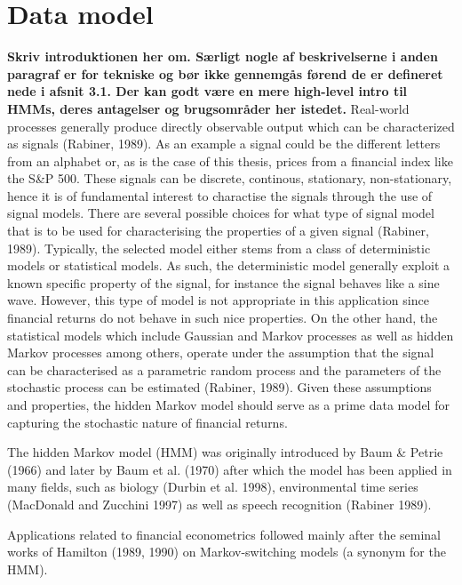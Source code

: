 \newpage
 \section{Data model}
 
 \textbf{Skriv introduktionen her om. Særligt nogle af beskrivelserne i anden paragraf er for tekniske og bør ikke gennemgås førend de er defineret nede i afsnit 3.1. Der kan godt være en mere high-level intro til HMMs, deres antagelser og brugsområder her istedet.}
Real-world processes generally produce directly observable output which can be characterized as signals (Rabiner, 1989). As an example a signal could be the different letters from an alphabet or, as is the case of this thesis, prices from a financial index like the S\&P 500. These signals can be discrete, continous, stationary, non-stationary, hence it is of fundamental interest to charactise the signals through the use of signal models. There are several possible choices for what type of signal model that is to be used for characterising the properties of a given signal (Rabiner, 1989). Typically, the selected model either stems from a class of deterministic models or statistical models. As such, the deterministic model generally exploit a known specific property of the signal, for instance the signal behaves like a sine wave. However, this type of model is not appropriate in this application since financial returns do not behave in such nice properties. On the other hand, the statistical models which include Gaussian and Markov processes as well as hidden Markov processes among others, operate under the assumption that the signal can be characterised as a parametric random process  and the parameters of the stochastic process can be estimated (Rabiner, 1989). Given these assumptions and properties, the hidden Markov model should serve as a prime data model for capturing the stochastic nature of financial returns.

The hidden Markov model (HMM) was originally introduced by Baum \& Petrie (1966) and later by Baum et al. (1970) after which the model has been applied in many fields, such as biology (Durbin et al. 1998), environmental time series (MacDonald and Zucchini 1997) as well as speech recognition (Rabiner 1989). 

Applications related to
financial econometrics followed mainly after the seminal
works of Hamilton (1989, 1990) on Markov-switching
models (a synonym for the HMM). 
 
